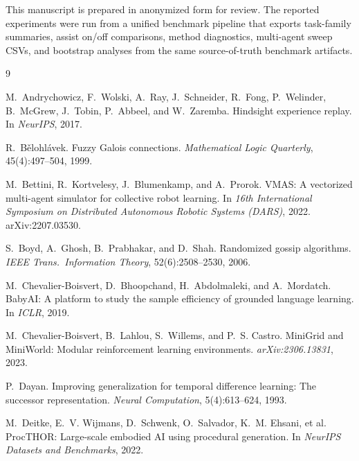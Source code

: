 \documentclass{article}
\begin{document}
\begin{ack}
This manuscript is prepared in anonymized form for review. The
reported experiments were run from a unified benchmark pipeline that
exports task-family summaries, assist on/off comparisons, method
diagnostics, multi-agent sweep CSVs, and bootstrap analyses from the
same source-of-truth benchmark artifacts.
\end{ack}

{\small
\begin{thebibliography}{9}

M.~Andrychowicz, F.~Wolski, A.~Ray, J.~Schneider, R.~Fong, P.~Welinder, B.~McGrew, J.~Tobin, P.~Abbeel, and W.~Zaremba.
\newblock Hindsight experience replay.
\newblock In \emph{NeurIPS}, 2017.

R.~B\v{e}lohl\'avek.
\newblock Fuzzy Galois connections.
\newblock \emph{Mathematical Logic Quarterly}, 45(4):497--504, 1999.

M.~Bettini, R.~Kortvelesy, J.~Blumenkamp, and A.~Prorok.
\newblock VMAS: A vectorized multi-agent simulator for collective robot learning.
\newblock In \emph{16th International Symposium on Distributed Autonomous Robotic Systems (DARS)}, 2022.
\newblock arXiv:2207.03530.

S.~Boyd, A.~Ghosh, B.~Prabhakar, and D.~Shah.
\newblock Randomized gossip algorithms.
\newblock \emph{IEEE Trans.\ Information Theory}, 52(6):2508--2530, 2006.

M.~Chevalier-Boisvert, D.~Bhoopchand, H.~Abdolmaleki, and A.~Mordatch.
\newblock BabyAI: A platform to study the sample efficiency of grounded language learning.
\newblock In \emph{ICLR}, 2019.

M.~Chevalier-Boisvert, B.~Lahlou, S.~Willems, and P.~S. Castro.
\newblock MiniGrid and MiniWorld: Modular reinforcement learning environments.
\newblock \emph{arXiv:2306.13831}, 2023.

P.~Dayan.
\newblock Improving generalization for temporal difference learning: The successor representation.
\newblock \emph{Neural Computation}, 5(4):613--624, 1993.

M.~Deitke, E.~V. Wijmans, D.~Schwenk, O.~Salvador, K.~M. Ehsani, et al.
\newblock ProcTHOR: Large-scale embodied AI using procedural generation.
\newblock In \emph{NeurIPS Datasets and Benchmarks}, 2022.


\end{thebibliography}}
\end{document}
